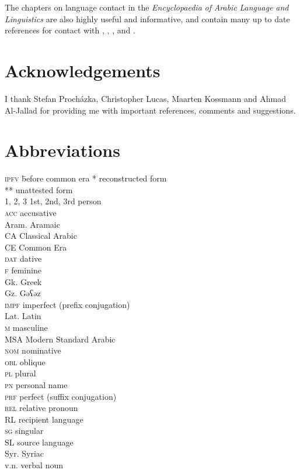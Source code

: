 \documentclass[output=paper]{langsci/langscibook}
\begin{document}
The chapters on language contact in the \textit{Encyclopaedia} \textit{of} \textit{Arabic} \textit{Language} \textit{and} \textit{Linguistics} are also highly useful and informative, and contain many up to date references for contact with  \citep{Gutas2011},  \citep{Asbaghi2011},  \cite{Retsö2011}, and  \citep{Procházka2011Turkish}.

\section*{Acknowledgements}
I thank Stefan Procházka, Christopher Lucas, Maarten Kossmann and Ahmad Al-Jallad for providing me with important references, comments and suggestions.

\section*{Abbreviations}
\begin{multicols}{2}
\begin{tabbing}
\textsc{ipfv} \hspace{1em} \= before common era\kill
*             \>  reconstructed form\\
**            \>  unattested form\\
\textsc {1, 2, 3} \> 1st, 2nd, 3rd person \\
\textsc{acc}  \>  accusative\\
{Aram.}         \>  Aramaic\\
{CA}            \>  Classical {Arabic}\\
CE            \>  Common Era\\
\textsc{dat}  \>  dative\\
\textsc{f}    \>  feminine\\
Gk.          \>  Greek\\
Gz.           \>  Gəʕəz\\
\textsc{impf} \>  imperfect (prefix conjugation)\\
Lat.         \>  Latin\\
\textsc{m}    \>  masculine\\
{MSA}           \>  Modern Standard {Arabic}\\
\textsc{nom}  \>  nominative\\
\textsc{obl}  \>  oblique\\
\textsc{pl}   \>  plural\\
\textsc{pn}   \> personal name\\
\textsc{prf}  \>  perfect (suffix conjugation)\\
\textsc{rel}  \>  {relative} pronoun\\
{RL}          \>  {recipient language}\\
\textsc{sg}   \>  singular\\
{SL}          \>  {source language}\\
Syr.          \>  Syriac\\
v.n.         \>  verbal noun
\end{tabbing}
\end{multicols}


{\sloppy\printbibliography[heading=subbibliography,notkeyword=this]}
\end{document}
